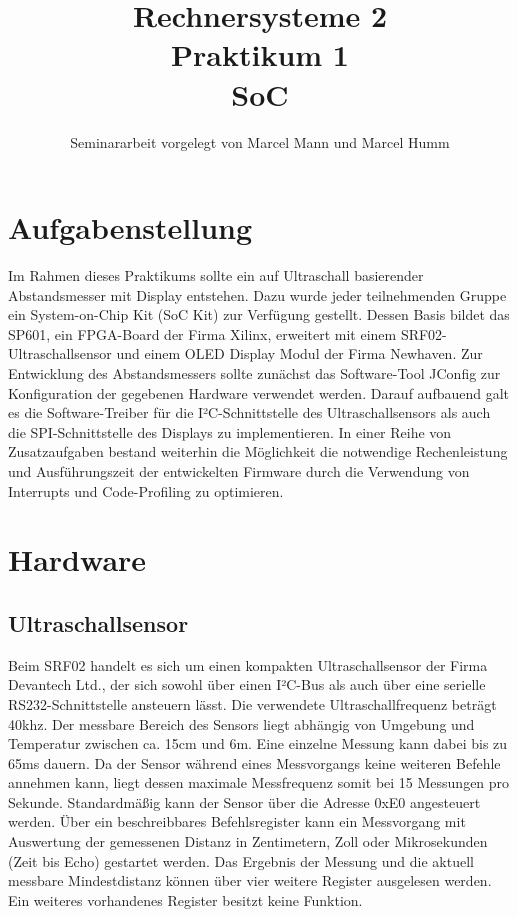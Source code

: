 \documentclass[parskip,
							 oneside,
							 11pt,
							 noheadingspace,
							 accentcolor=tud1d,
							 bigchapter,
							 colorback]{tudreport}
\title{\textbf{Rechnersysteme 2 \\ Praktikum 1 \\ SoC}}
\subtitle{Seminararbeit vorgelegt von Marcel Mann und Marcel Humm}
\begin{document}
\maketitle
\cleardoublepage

\pagestyle{empty}


\pagestyle{headings}


\chapter{Aufgabenstellung}
Im Rahmen dieses Praktikums sollte ein auf Ultraschall basierender Abstandsmesser mit Display entstehen. Dazu wurde jeder teilnehmenden Gruppe ein System-on-Chip Kit (SoC Kit) zur Verfügung gestellt. Dessen Basis bildet das SP601, ein FPGA-Board der Firma Xilinx, erweitert mit einem SRF02-Ultraschallsensor und einem OLED Display Modul der Firma Newhaven.
Zur Entwicklung des Abstandsmessers sollte zunächst das Software-Tool JConfig zur Konfiguration der gegebenen Hardware verwendet werden. Darauf aufbauend galt es die Software-Treiber für die I²C-Schnittstelle des Ultraschallsensors als auch die SPI-Schnittstelle des Displays zu implementieren.
In einer Reihe von Zusatzaufgaben bestand weiterhin die Möglichkeit die notwendige Rechenleistung und Ausführungszeit der entwickelten Firmware durch die Verwendung von Interrupts und Code-Profiling zu optimieren.

\chapter{Hardware}

\section{Ultraschallsensor}
Beim SRF02 handelt es sich um einen kompakten Ultraschallsensor der Firma Devantech Ltd., der sich sowohl über einen I²C-Bus als auch über eine serielle RS232-Schnittstelle ansteuern lässt. Die verwendete Ultraschallfrequenz beträgt 40khz.
Der messbare Bereich des Sensors liegt abhängig von Umgebung und Temperatur zwischen ca. 15cm und 6m. Eine einzelne Messung kann dabei bis zu 65ms dauern. Da der Sensor während eines Messvorgangs keine weiteren Befehle annehmen kann, liegt dessen maximale Messfrequenz somit bei 15 Messungen pro Sekunde.
Standardmäßig kann der Sensor über die Adresse 0xE0 angesteuert werden. Über ein beschreibbares Befehlsregister kann ein Messvorgang mit Auswertung der gemessenen Distanz in Zentimetern, Zoll oder Mikrosekunden (Zeit bis Echo) gestartet werden. Das Ergebnis der Messung und die aktuell messbare Mindestdistanz können über vier weitere Register ausgelesen werden. Ein weiteres vorhandenes Register besitzt keine Funktion.
\end{document}
